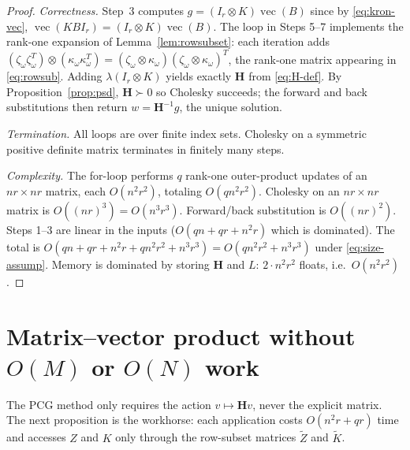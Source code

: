 \documentclass[12pt]{article}
\theoremstyle{definition}
\newcommand{\vecop}{\operatorname{vec}}
\newcommand{\Kt}{\widetilde{K}}
\newcommand{\Zt}{\widetilde{Z}}
\begin{document}
\begin{proof}
\emph{Correctness.} Step~3 computes $g=(I_r\otimes K)\vecop(B)$ since by \eqref{eq:kron-vec},
$\vecop(K B I_r)=(I_r\otimes K)\vecop(B)$. The loop in Steps 5--7 implements the rank-one
expansion of Lemma~\ref{lem:rowsubset}: each iteration adds
$(\zeta_\omega\zeta_\omega^T)\otimes(\kappa_\omega\kappa_\omega^T)
=(\zeta_\omega\otimes\kappa_\omega)(\zeta_\omega\otimes\kappa_\omega)^T$, the rank-one matrix
appearing in \eqref{eq:rowsub}. Adding $\lambda(I_r\otimes K)$ yields exactly $\mathbf{H}$ from
\eqref{eq:H-def}. By Proposition~\ref{prop:psd}, $\mathbf{H}\succ 0$ so Cholesky succeeds; the
forward and back substitutions then return $w=\mathbf{H}^{-1}g$, the unique solution.

\emph{Termination.} All loops are over finite index sets. Cholesky on a symmetric positive
definite matrix terminates in finitely many steps.

\emph{Complexity.} The for-loop performs $q$ rank-one outer-product updates of an
$nr\times nr$ matrix, each $O(n^2r^2)$, totaling $O(qn^2r^2)$. Cholesky on an $nr\times nr$
matrix is $O((nr)^3)=O(n^3r^3)$. Forward/back substitution is $O((nr)^2)$. Steps 1--3 are
linear in the inputs ($O(qn+qr+n^2r)$ which is dominated). The total is
$O(qn+qr+n^2r+qn^2r^2+n^3r^3)=O(qn^2r^2+n^3r^3)$ under \eqref{eq:size-assump}.
Memory is dominated by storing $\mathbf{H}$ and $L$: $2\cdot n^2r^2$ floats, i.e.\ $O(n^2r^2)$.
\end{proof}

\section{Matrix--vector product without $O(M)$ or $O(N)$ work}\label{sec:matvec}

The PCG method only requires the action $v\mapsto \mathbf{H}v$, never the explicit matrix.
The next proposition is the workhorse: each application costs $O(n^2 r+qr)$ time and accesses
$Z$ and $K$ only through the row-subset matrices $\Zt$ and $\Kt$.
\end{document}

